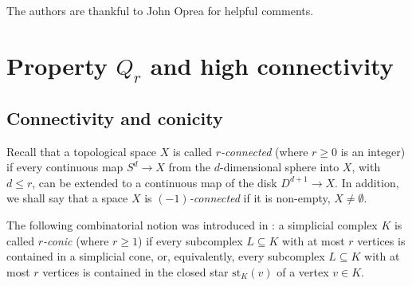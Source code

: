\documentclass[11pt,twoside, reqno]{amsart}
\theoremstyle{plain}
\newtheorem{teo}[lema]{Theorem}
\theoremstyle{definition}
\newcommand{\N}{\mathbb{N}}
\newcommand{\TC}{\textrm{TC}}
\newcommand{\st}{\textrm{st}}
\newcommand{\cat}{{\sf{cat}}}
\newcommand{\tc}{{\sf{TC}}}
\begin{document}
The authors are thankful to John Oprea for helpful comments.




%
%





\section{Property $Q_r$ and high connectivity}

\subsection{Connectivity and conicity} 

Recall that a topological space $X$ is called {\it $r$-connected} (where $r\ge 0$ is an integer) if every continuous map $S^d\to X$ from the $d$-dimensional sphere into $X$, with $d\le r$, can be extended to a continuous map of the disk $D^{d+1}\to X$. In addition, we shall say that a space $X$ is {\it $(-1)$-connected} if it is non-empty, $X\not=\emptyset$.

The following combinatorial notion was introduced in \cite{Bar}: a simplicial complex $K$ is called \textit{$r$-conic} (where $r\ge 1$) if every subcomplex $L\subseteq K$ with at most $r$ vertices is contained in a simplicial cone, or, equivalently, every subcomplex $L\subseteq K$ with at most $r$ vertices
is contained in the closed star $\st_K (v)$ of a vertex $v\in K$. 
\end{document}
